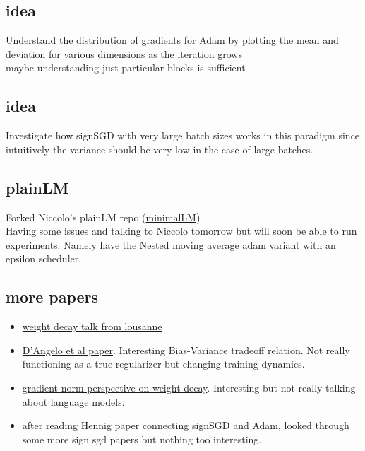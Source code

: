\documentclass[12pt]{book}
\begin{document}
\subsection*{idea}
Understand the distribution of gradients for Adam by plotting the mean and deviation for various dimensions as the iteration grows
\\
maybe understanding just particular blocks is sufficient

\subsection*{idea}
Investigate how signSGD with very large batch sizes works in this paradigm since intuitively the variance should be very low in the case of large batches. 

\subsection*{plainLM}
Forked Niccolo's plainLM repo (\href{https://github.com/sam-laing/minimalLM/tree/main}{minimalLM})
\\
Having some issues and talking to Niccolo tomorrow but will soon be able to run experiments. Namely have the Nested moving average adam variant with an epsilon scheduler. 

\subsection*{more papers}
\begin{itemize}
	\item \href{https://www.andriushchenko.me/assets/pdf/Why Do We Need Weight Decay in Modern Deep Learning.pdf}{weight decay talk from lousanne }
	\item \href{https://arxiv.org/pdf/2310.04415}{D'Angelo et al paper}. Interesting Bias-Variance tradeoff relation. Not really functioning as a true regularizer but changing training dynamics.
	\item \href{https://proceedings.neurips.cc/paper_files/paper/2023/file/040d3b6af368bf71f952c18da5713b48-Paper-Conference.pdf}{gradient norm perspective on weight decay}. Interesting but not really talking about language models. 
	\item after reading Hennig paper connecting signSGD and Adam, looked through some more sign sgd papers but nothing too interesting.
\end{itemize}
\end{document}
